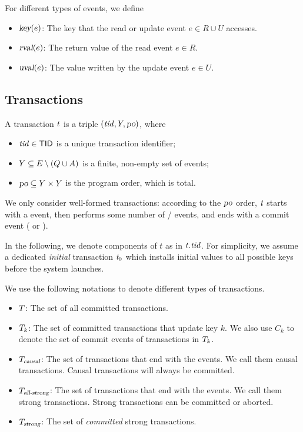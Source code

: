 For different types of events, we define
\begin{itemize}
  \item $\textsl{key}(e)$: The key that the read or update event
    $e \in R \cup U$ accesses.
  \item $\textsl{rval}(e)$: The return value of the read event $e \in R$.
  \item $\textsl{uval}(e)$: The value written by the update event $e \in U$.
\end{itemize}
\subsection{Transactions} \label{ss:transactions}

\begin{appdefinition}[Transactions] \label{def:tx}
  A transaction $\mathit{t}$ is a triple $(\mathit{tid}, Y, \textsl{po})$, where
  \begin{itemize}
    \item $\mathit{tid} \in {\sf TID}$ is a unique transaction identifier;
    \item $Y \subseteq E \setminus (Q \cup A)$
      is a finite, non-empty set of events;
    \item $\textsl{po} \subseteq Y \times Y$
      is the program order, which is total.
  \end{itemize}
  We only consider well-formed transactions: according to the $\textsl{po}$ order,
  $\mathit{t}$ starts with a \start{} event, then performs some number of
  \read{}/\updateproc{} events, and ends with a commit event (\commitcausaltx{}
  or \commitstrongtx).
\end{appdefinition}

In the following, we denote components of $t$ as in $t.\mathit{tid}$.
For simplicity, we assume a dedicated \emph{initial} transaction $\mathit{t}_{0}$
which installs initial values to all possible keys before the system launches.

We use the following notations to denote different types of transactions.
\begin{itemize}
  \item $T$: The set of all committed transactions.
  \item $T_{k}$: The set of committed transactions that update key $k$.
    We also use $C_{k}$ to denote the set of commit events of transactions
    in $T_{k}$.
  \item $T_{\textsl{causal}}$: The set of transactions that
    end with the \commitcausaltx{} events.
    We call them causal transactions.
    Causal transactions will always be committed.
  \item $T_{\textsl{all-strong}}$: The set of transactions that
    end with the \commitstrongtx{} events.
    We call them strong transactions.
    Strong transactions can be committed or aborted.
  \item $T_{\textsl{strong}}$: The set of \emph{committed} strong transactions.
\end{itemize}

